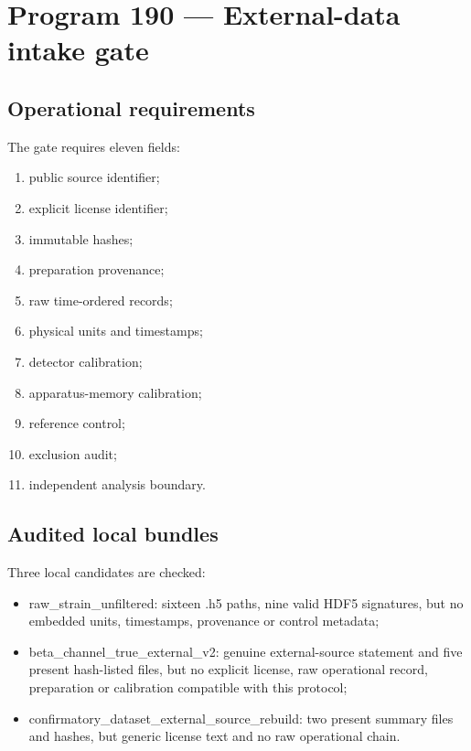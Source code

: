 \documentclass[11pt,a4paper,openany]{report}
\begin{document}
\chapter{Program 190 --- External-data intake gate}

\section{Operational requirements}

The gate requires eleven fields:

\begin{enumerate}
\item 
public source identifier;

\item 
explicit license identifier;

\item 
immutable hashes;

\item 
preparation provenance;

\item 
raw time-ordered records;

\item 
physical units and timestamps;

\item 
detector calibration;

\item 
apparatus-memory calibration;

\item 
reference control;

\item 
exclusion audit;

\item 
independent analysis boundary.

\end{enumerate}

\section{Audited local bundles}

Three local candidates are checked:

\begin{itemize}
\item 
raw\_strain\_unfiltered: sixteen .h5 paths, nine valid HDF5 signatures, but no embedded units, timestamps, provenance or control metadata;

\item 
beta\_channel\_true\_external\_v2: genuine external-source statement and five present hash-listed files, but no explicit license, raw operational record, preparation or calibration compatible with this protocol;

\item 
confirmatory\_dataset\_external\_source\_rebuild: two present summary files and hashes, but generic license text and no raw operational chain.

\end{itemize}
\end{document}
